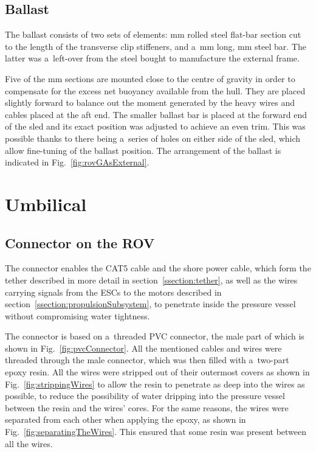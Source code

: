 \subsection{Ballast}
The ballast consists of two sets of elements: \unit[4 by 30]{mm} rolled steel flat-bar section cut to the length of the transverse clip stiffeners, and a~\unit[186]{mm} long, \unit[2 by 20]{mm} steel bar. The latter was a~left-over from the steel bought to manufacture the external frame.

Five of the \unit[4 by 30]{mm} sections are mounted close to the centre of gravity in order to compensate for the excess net buoyancy available from the hull. They are placed slightly forward to balance out the moment generated by the heavy wires and cables placed at the aft end. The smaller ballast bar is placed at the forward end of the sled and its exact position was adjusted to achieve an even trim. This was possible thanks to there being a~series of holes on either side of the sled, which allow fine-tuning of the ballast position. The arrangement of the ballast is indicated in Fig.~\ref{fig:rovGAsExternal}.

\clearpage %

\section{Umbilical}\label{section:umbilical}

\subsection{Connector on the ROV}\label{ssection:connectorOnTheROV}
The connector enables the CAT5 cable and the shore power cable, which form the tether described in more detail in section~\ref{ssection:tether}, as well as the wires carrying signals from the ESCs to the motors described in section~\ref{ssection:propulsionSubsystem}, to penetrate inside the pressure vessel without compromising water tightness.

The connector is based on a~threaded PVC connector, the male part of which is shown in Fig.~\ref{fig:pvcConnector}. All the mentioned cables and wires were threaded through the male connector, which was then filled with a~two-part epoxy resin. All the wires were stripped out of their outermost covers as shown in Fig.~\ref{fig:strippingWires} to allow the resin to penetrate as deep into the wires as possible, to reduce the possibility of water dripping into the pressure vessel between the resin and the wires' cores. For the same reasons, the wires were separated from each other when applying the epoxy, as shown in Fig.~\ref{fig:separatingTheWires}. This ensured that some resin was present between all the wires.

